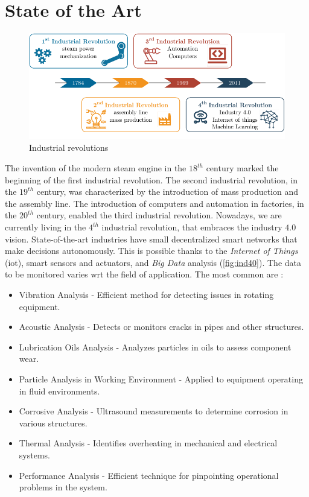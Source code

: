 \chapter{State of the Art}
\label{ch:state_of_the_art}

\begin{figure}[h]
    \centering
    \includegraphics[width=\textwidth]{images/StateArt/Industry40.pdf}
    \caption{Industrial revolutions}
    \label{fig:ind40}    
\end{figure}

The invention of the modern steam engine in the $18^{th}$ century marked the beginning of the first industrial revolution. The second industrial revolution, in the $19^{th}$ century, was characterized by the introduction of mass production and the assembly line. The introduction of computers and automation in factories, in the $20^{th}$ century, enabled the third industrial revolution. Nowadays, we are currently living in the $4^{th}$ industrial revolution, that embraces the industry $4.0$ vision. State-of-the-art industries have small decentralized smart networks that make decisions autonomously. This is possible thanks to the \emph{Internet of Things} (\gls{iot}), smart sensors and actuators, and \emph{Big Data} analysis (\autoref{fig:ind40}). 
The data to be monitored varies \gls{wrt} the field of application. The most common are \cite{State_Art_Coanda_2020}:
\begin{itemize}
    \item Vibration Analysis - Efficient method for detecting issues in rotating equipment.
    \item Acoustic Analysis - Detects or monitors cracks in pipes and other structures.
    \item Lubrication Oils Analysis - Analyzes particles in oils to assess component wear.
    \item Particle Analysis in Working Environment - Applied to equipment operating in fluid environments.
    \item Corrosive Analysis - Ultrasound measurements to determine corrosion in various structures.
    \item Thermal Analysis - Identifies overheating in mechanical and electrical systems.
    \item Performance Analysis - Efficient technique for pinpointing operational problems in the system.
\end{itemize}



